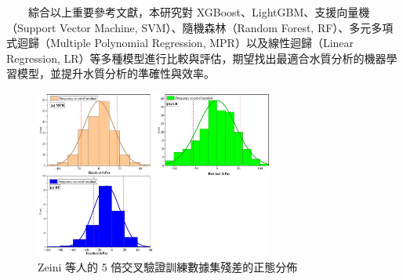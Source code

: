 \documentclass[12pt,a4paper]{article}
\begin{document}
\begin{enumerate}
\begin{enumerate}[label=\arabic*.]
　　綜合以上重要參考文獻，本研究對 XGBoost、LightGBM、支援向量機（Support Vector Machine, SVM）、隨機森林（Random Forest, RF）、多元多項式迴歸（Multiple Polynomial Regression, MPR）以及線性迴歸（Linear Regression, LR）等多種模型進行比較與評估，期望找出最適合水質分析的機器學習模型，並提升水質分析的準確性與效率。
    \begin{figure}[H]
        \centering
        \includegraphics[width=0.7\textwidth]{resources/image/applsci-13-05131-g004-550.jpg}
        \caption{Zeini 等人的 5 倍交叉驗證訓練數據集殘差的正態分佈}
        \label{fig:MPR_validation}
    \end{figure}
\end{enumerate}


\end{enumerate}
\end{document}
